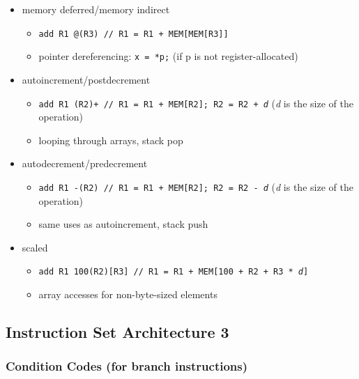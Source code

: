 \documentclass[12pt]{extarticle}
\begin{document}
\begin{itemize}
		\item memory deferred/memory indirect
		\begin{itemize}
			\item \texttt{add R1 @(R3) // R1 = R1 + MEM[MEM[R3]]}
			\item pointer dereferencing: \texttt{x = *p;} (if p is not register-allocated)
		\end{itemize}

		\item autoincrement/postdecrement
		\begin{itemize}
			\item \texttt{add R1 (R2)+ // R1 = R1 + MEM[R2]; R2 = R2 + \textit{d}} (\textit{d} is the size of the operation)
			\item looping through arrays, stack pop
		\end{itemize}

		\item autodecrement/predecrement
		\begin{itemize}
			\item \texttt{add R1 -(R2) // R1 = R1 + MEM[R2]; R2 = R2 - \textit{d}} (\textit{d} is the size of the operation)
			\item same uses as autoincrement, stack push
		\end{itemize}

		\item scaled
		\begin{itemize}
			\item \texttt{add R1 100(R2)[R3] // R1 = R1 + MEM[100 + R2 + R3 * \textit{d}]}
			\item array accesses for non-byte-sized elements
		\end{itemize}
	\end{itemize}

	\subsection{Instruction Set Architecture 3}

	\subsubsection{Condition Codes (for branch instructions)}
\end{document}
